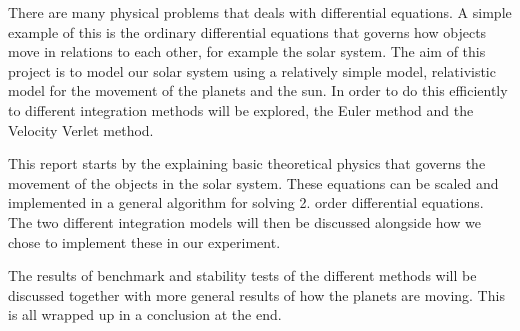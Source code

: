 
There are many physical problems that deals with differential equations. A simple example of this is the ordinary differential equations that governs how objects move in relations to each other, for example the solar system. The aim of this project is to model our solar system using a relatively simple model, relativistic model for the movement of the planets and the sun. In order to do this efficiently to different integration methods will be explored, the Euler method and the Velocity Verlet method. 


This report starts by the explaining basic theoretical physics that governs the movement of the objects in the solar system. These equations can be scaled and implemented in a general algorithm for solving 2. order differential equations. The two different integration models will then be discussed alongside how we chose to implement these in our experiment.

The results of benchmark and stability tests of the different methods will be discussed together with more general results of how the planets are moving. This is all wrapped up in a conclusion at the end.
